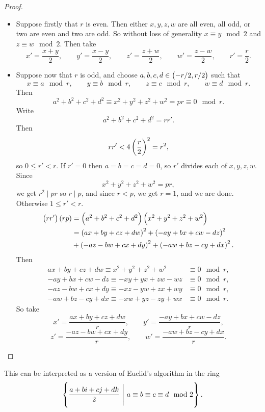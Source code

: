 \begin{proof}
\hfill
\begin{itemize}
\item Suppose firstly that $ r $ is even. Then either $ x, y, z, w $ are all even, all odd, or two are even and two are odd. So without loss of generality $ x \equiv y \mod 2 $ and $ z \equiv w \mod 2 $. Then take
$$ x' = \dfrac{x + y}{2}, \qquad y' = \dfrac{x - y}{2}, \qquad z' = \dfrac{z + w}{2}, \qquad w' = \dfrac{z - w}{2}, \qquad r' = \dfrac{r}{2}. $$

\pagebreak

\item Suppose now that $ r $ is odd, and choose $ a, b, c, d \in \br{-r / 2, r / 2} $ such that
$$ x \equiv a \mod r, \qquad y \equiv b \mod r, \qquad z \equiv c \mod r, \qquad w \equiv d \mod r. $$
Then
$$ a^2 + b^2 + c^2 + d^2 \equiv x^2 + y^2 + z^2 + w^2 = pr \equiv 0 \mod r. $$
Write
$$ a^2 + b^2 + c^2 + d^2 = rr'. $$
Then
$$ rr' < 4\br{\dfrac{r}{2}}^2 = r^2, $$
so $ 0 \le r' < r $. If $ r' = 0 $ then $ a = b = c = d = 0 $, so $ r' $ divides each of $ x, y, z, w $. Since
$$ x^2 + y^2 + z^2 + w^2 = pr, $$
we get $ r^2 \mid pr $ so $ r \mid p $, and since $ r < p $, we get $ r = 1 $, and we are done. Otherwise $ 1 \le r' < r $.
\begin{align*}
\br{rr'}\br{rp}
& = \br{a^2 + b^2 + c^2 + d^2}\br{x^2 + y^2 + z^2 + w^2} \\
& = \br{ax + by + cz + dw}^2 + \br{-ay + bx + cw - dz}^2 \\
& + \br{-az - bw + cx + dy}^2 + \br{-aw + bz - cy + dx}^2.
\end{align*}
Then
\begin{align*}
ax + by + cz + dw \equiv x^2 + y^2 + z^2 + w^2 & \equiv 0 \mod r, \\
-ay + bx + cw - dz \equiv -xy + yx + zw - wz & \equiv 0 \mod r, \\
-az - bw + cx + dy \equiv -xz - yw + zx + wy & \equiv 0 \mod r, \\
-aw + bz - cy + dx \equiv -xw + yz - zy + wx & \equiv 0 \mod r.
\end{align*}
So take
$$ x' = \dfrac{ax + by + cz + dw}{r}, \qquad y' = \dfrac{-ay + bx + cw - dz}{r}, $$
$$ z' = \dfrac{-az - bw + cx + dy}{r}, \qquad w' = \dfrac{-aw + bz - cy + dx}{r}. $$
\end{itemize}
\end{proof}

\begin{remark}
This can be interpreted as a version of Euclid's algorithm in the ring
$$ \cbr{\dfrac{a + bi + cj + dk}{2} \ \Bigg| \ a \equiv b \equiv c \equiv d \mod 2}. $$
\end{remark}

